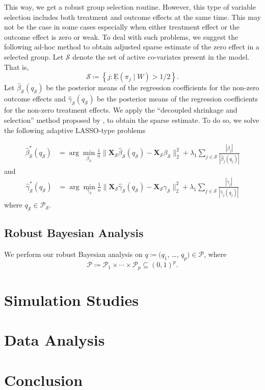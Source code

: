 \documentclass{amsart}
\newcommand{\x}{\boldsymbol{X}}
\newcommand{\lexp}{\underline{\text{E}}}
\begin{document}
This way, we get a robust group selection routine. However, this type of variable 
selection includes both treatment and outcome effects at the same time. This may not be the
case in some cases especially when either treatment effect or the outcome effect is zero or
weak. To deal with such problems, we suggest the following ad-hoc method to obtain 
adjusted sparse estimate of the zero effect in a selected group.
Let $\mathcal{S}$ denote the set of active co-variates present in the model. That is,
\begin{equation}
    \mathcal{S}\coloneqq
    \left\{j : \lexp(\pi_j\mid W) > 1/2\right\}.
\end{equation}
Let $\hat{\beta}_{\mathcal{S}}(q_{\mathcal{S}})$ be the posterior means of the regression
coefficients for the non-zero outcome effects and
$\hat{\gamma}_{\mathcal{S}}(q_{\mathcal{S}})$ be the posterior means of the regression
coefficients for the non-zero treatment effects. We apply the 
``decoupled shrinkage and selection'' method proposed by \citet{hahn2015}, to obtain
the sparse estimate. To do so, we solve the following adaptive LASSO-type \cite{Zou2006}
problems

\begin{align}
    \hat{\beta}^*_{\mathcal{S}}(q_{\mathcal{S}}) &= 
    \arg\min_{\beta_{\mathcal{S}}} \frac{1}{n}\|\x_{\mathcal{S}}\hat{\beta}_{\mathcal{S}}(q_{\mathcal{S}})
    - \x_{\mathcal{S}} \beta_{\mathcal{S}}\|_2^2 + \lambda_1\sum_{j\in\mathcal{S}} 
    \frac{|\beta_j|}{|\hat{\beta}_j(q_j)|}
\end{align}
and
\begin{align}
    \hat{\gamma}^*_{\mathcal{S}}(q_{\mathcal{S}}) &= 
    \arg\min_{\gamma_{\mathcal{S}}} \frac{1}{n}\|\x_{\mathcal{S}}\hat{\gamma}_{\mathcal{S}}(q_{\mathcal{S}})
    - \x_{\mathcal{S}} \gamma_{\mathcal{S}}\|_2^2 + \lambda_1\sum_{j\in\mathcal{S}} 
    \frac{|\gamma_j|}{|\hat{\gamma}_j(q_j)|}
\end{align}
where $q_{\mathcal{S}}\in \mathcal{P}_{\mathcal{S}}$.

\subsection{Robust Bayesian Analysis}
We perform our
robust Bayesian analysis on $q\coloneqq(q_1$, \dots, $q_p)\in\mathcal{P}$, where
\begin{equation}
\mathcal{P} \coloneqq \mathcal{P}_1\times\cdots\times\mathcal{P}_p\subseteq \left(0, 1\right)^{p}.
\end{equation}



\section{Simulation Studies}\label{sec:sim}

\section{Data Analysis}\label{sec:data:analysis}

\section{Conclusion}\label{sec:conc}



\end{document}
